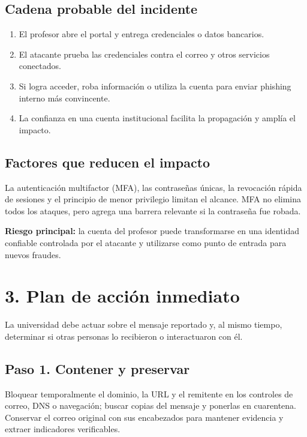 \documentclass[11pt,a4paper]{article}
\newcommand{\infobox}[1]{%
  \noindent\colorbox{fondo}{\parbox{\dimexpr\textwidth-2\fboxsep}{#1}}}
\newcommand{\reportpage}{\clearpage\thispagestyle{fancy}}
\begin{document}
\subsection*{Cadena probable del incidente}

\begin{enumerate}
  \item El profesor abre el portal y entrega credenciales o datos bancarios.
  \item El atacante prueba las credenciales contra el correo y otros servicios conectados.
  \item Si logra acceder, roba información o utiliza la cuenta para enviar phishing interno más convincente.
  \item La confianza en una cuenta institucional facilita la propagación y amplía el impacto.
\end{enumerate}

\subsection*{Factores que reducen el impacto}

La autenticación multifactor (MFA), las contraseñas únicas, la revocación rápida de sesiones y el principio de menor privilegio limitan el alcance. MFA no elimina todos los ataques, pero agrega una barrera relevante si la contraseña fue robada.

\infobox{\textcolor{azul}{\textbf{Riesgo principal:}} la cuenta del profesor puede transformarse en una identidad confiable controlada por el atacante y utilizarse como punto de entrada para nuevos fraudes.}

\reportpage
\section*{3. Plan de acción inmediato}

La universidad debe actuar sobre el mensaje reportado y, al mismo tiempo, determinar si otras personas lo recibieron o interactuaron con él.

\subsection*{Paso 1. Contener y preservar}

Bloquear temporalmente el dominio, la URL y el remitente en los controles de correo, DNS o navegación; buscar copias del mensaje y ponerlas en cuarentena. Conservar el correo original con sus encabezados para mantener evidencia y extraer indicadores verificables.
\end{document}
